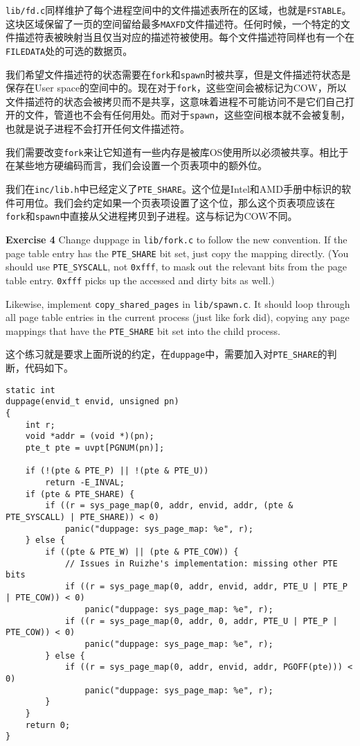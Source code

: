 \documentclass[11pt]{article}
\begin{document}
\lstinline|lib/fd.c|同样维护了每个进程空间中的文件描述表所在的区域，也就是\lstinline|FSTABLE|。这块区域保留了一页的空间留给最多\lstinline|MAXFD|文件描述符。任何时候，一个特定的文件描述符表被映射当且仅当对应的描述符被使用。每个文件描述符同样也有一个在\lstinline|FILEDATA|处的可选的数据页。

我们希望文件描述符的状态需要在\lstinline|fork|和\lstinline|spawn|时被共享，但是文件描述符状态是保存在User space的空间中的。现在对于\lstinline|fork|，这些空间会被标记为COW，所以文件描述符的状态会被拷贝而不是共享，这意味着进程不可能访问不是它们自己打开的文件，管道也不会有任何用处。而对于\lstinline|spawn|，这些空间根本就不会被复制，也就是说子进程不会打开任何文件描述符。

我们需要改变\lstinline|fork|来让它知道有一些内存是被库OS使用所以必须被共享。相比于在某些地方硬编码而言，我们会设置一个页表项中的额外位。

我们在\lstinline|inc/lib.h|中已经定义了\lstinline|PTE_SHARE|。这个位是Intel和AMD手册中标识的软件可用位。我们会约定如果一个页表项设置了这个位，那么这个页表项应该在\lstinline|fork|和\lstinline|spawn|中直接从父进程拷贝到子进程。这与标记为COW不同。

\begin{framed}
\noindent\textbf{Exercise 4} Change duppage in \lstinline|lib/fork.c| to follow the new convention. If the page table entry has the \lstinline|PTE_SHARE| bit set, just copy the mapping directly. (You should use \lstinline|PTE_SYSCALL|, not \lstinline|0xfff|, to mask out the relevant bits from the page table entry. \lstinline|0xfff| picks up the accessed and dirty bits as well.)

Likewise, implement \lstinline|copy_shared_pages| in \lstinline|lib/spawn.c|. It should loop through all page table entries in the current process (just like fork did), copying any page mappings that have the \lstinline|PTE_SHARE| bit set into the child process.
\end{framed}

这个练习就是要求上面所说的约定，在\lstinline|duppage|中，需要加入对\lstinline|PTE_SHARE|的判断，代码如下。
\begin{lstlisting}[title=lib/fork.c]
static int
duppage(envid_t envid, unsigned pn)
{
	int r;
	void *addr = (void *)(pn);
	pte_t pte = uvpt[PGNUM(pn)];

	if (!(pte & PTE_P) || !(pte & PTE_U))
		return -E_INVAL;
	if (pte & PTE_SHARE) {
		if ((r = sys_page_map(0, addr, envid, addr, (pte & PTE_SYSCALL) | PTE_SHARE)) < 0)
			panic("duppage: sys_page_map: %e", r);
	} else {
		if ((pte & PTE_W) || (pte & PTE_COW)) {
			// Issues in Ruizhe's implementation: missing other PTE bits
			if ((r = sys_page_map(0, addr, envid, addr, PTE_U | PTE_P | PTE_COW)) < 0)
				panic("duppage: sys_page_map: %e", r);
			if ((r = sys_page_map(0, addr, 0, addr, PTE_U | PTE_P | PTE_COW)) < 0)
				panic("duppage: sys_page_map: %e", r);
		} else {
			if ((r = sys_page_map(0, addr, envid, addr, PGOFF(pte))) < 0)
				panic("duppage: sys_page_map: %e", r);
		}
	}
	return 0;
}
\end{lstlisting}
\end{document}
